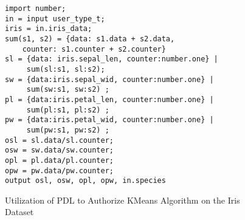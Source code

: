 \begin{figure}[h]
\centering
\begin{lstlisting}
import number;
in = input user_type_t;
iris = in.iris_data;
sum(s1, s2) = {data: s1.data + s2.data, 
    counter: s1.counter + s2.counter}
sl = {data: iris.sepal_len, counter:number.one} |
     sum(sl:s1, sl:s2);
sw = {data:iris.sepal_wid, counter:number.one} |
     sum(sw:s1, sw:s2) ;
pl = {data:iris.petal_len, counter:number.one} |
     sum(pl:s1, pl:s2) ;
pw = {data:iris.petal_wid, counter:number.one} |
     sum(pw:s1, pw:s2) ;
osl = sl.data/sl.counter;
osw = sw.data/sw.counter;
opl = pl.data/pl.counter;
opw = pw.data/pw.counter;
output osl, osw, opl, opw, in.species
\end{lstlisting}
\caption{Utilization of PDL to Authorize KMeans Algorithm on the Iris Dataset}
\label{fig:pdl}
\end{figure}

